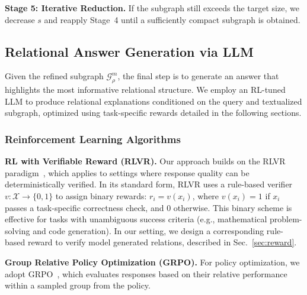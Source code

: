 \textbf{Stage 5: Iterative Reduction.}
If the subgraph still exceeds the target size, we decrease $s$ and reapply Stage~4
until a sufficiently compact subgraph is obtained.



\subsection{Relational Answer Generation via LLM}
\label{sec:llm_training}
Given the refined subgraph $\mathcal{G}^{m}_{\rho}$, the final step is to generate an answer that highlights the most informative relational structure.  
We employ an RL-tuned LLM to produce relational explanations conditioned on the query and textualized subgraph,
optimized using task-specific rewards detailed in the following sections.


\subsubsection{Reinforcement Learning Algorithms}
\textbf{RL with Verifiable Reward (RLVR).}
Our approach builds on the RLVR paradigm~\citep{Lambert2024TLU3P}, which applies to settings where response quality can be deterministically verified.
In its standard form, RLVR uses a rule-based verifier $v : \mathcal{X} \to \{0,1\}$ to assign binary rewards: $r_i = v(x_i)$, where $v(x_i)=1$ if $x_i$ passes a task-specific correctness check, and $0$ otherwise.
This binary scheme is effective for tasks with unambiguous success criteria (e.g., mathematical problem-solving and code generation).  
In our setting, we design a corresponding rule-based reward to verify model generated relations, described in Sec.~\ref{sec:reward}.


\textbf{Group Relative Policy Optimization (GRPO).}
For policy optimization, we adopt GRPO~\citep{shao2024deepseekmath},  
which evaluates responses based on their relative performance within a sampled group from the policy.  

